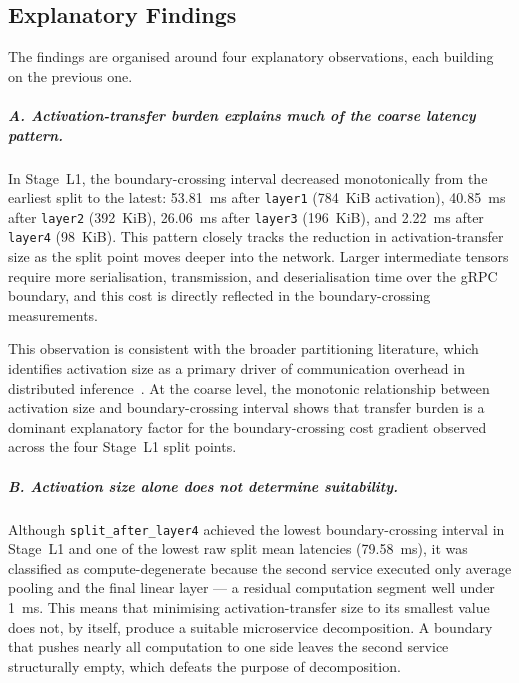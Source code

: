 \subsection{Explanatory Findings}
\label{sec:rq13-findings}

The findings are organised around four explanatory observations, each building on the previous one.

\subparagraph{A. Activation-transfer burden explains much of the coarse latency pattern.}

In Stage~L1, the boundary-crossing interval decreased monotonically from the earliest split to the latest: 53.81~ms after \texttt{layer1} (784~KiB activation), 40.85~ms after \texttt{layer2} (392~KiB), 26.06~ms after \texttt{layer3} (196~KiB), and 2.22~ms after \texttt{layer4} (98~KiB). This pattern closely tracks the reduction in activation-transfer size as the split point moves deeper into the network. Larger intermediate tensors require more serialisation, transmission, and deserialisation time over the gRPC boundary, and this cost is directly reflected in the boundary-crossing measurements.

This observation is consistent with the broader partitioning literature, which identifies activation size as a primary driver of communication overhead in distributed inference~\cite{neurosurgeon, jointdnn, bottlenet_pp, deeperthings, survey_partitioning}. At the coarse level, the monotonic relationship between activation size and boundary-crossing interval shows that transfer burden is a dominant explanatory factor for the boundary-crossing cost gradient observed across the four Stage~L1 split points.

\subparagraph{B. Activation size alone does not determine suitability.}

Although \texttt{split\_after\_layer4} achieved the lowest boundary-crossing interval in Stage~L1 and one of the lowest raw split mean latencies (79.58~ms), it was classified as compute-degenerate because the second service executed only average pooling and the final linear layer --- a residual computation segment well under 1~ms. This means that minimising activation-transfer size to its smallest value does not, by itself, produce a suitable microservice decomposition. A boundary that pushes nearly all computation to one side leaves the second service structurally empty, which defeats the purpose of decomposition.

